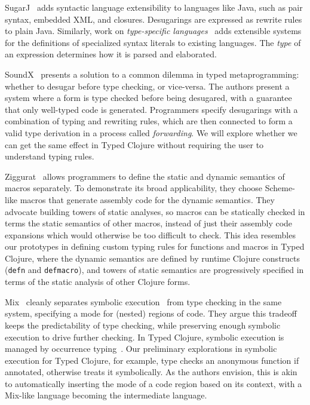 \documentclass[11pt]{iuthesis}
\begin{document}
SugarJ~\cite{Erdweg2011SJ}
adds syntactic language extensibility to languages like Java, such as pair
syntax, embedded XML, and closures.
Desugarings are expressed as rewrite rules to plain Java.
Similarly, work on \emph{type-specific languages}~\cite{omar2014safely}
adds extensible systems for the definitions of specialized syntax literals
to existing languages.
The \emph{type} of an expression determines how it is parsed and elaborated.

SoundX~\cite{Lorenzen2016STS} presents a solution to a common
dilemma in typed metaprogramming: whether to desugar before
type checking, or vice-versa.
The authors present a system where a form is type checked before 
being desugared, with a guarantee that only well-typed code is generated.
Programmers specify desugarings with a combination of typing and rewriting rules, 
which are then connected to form a valid type derivation
in a process called \emph{forwarding}.
We will explore whether we can get the same effect in Typed Clojure
without requiring the user to understand typing rules.

Ziggurat~\cite{Fisher06staticanalysis} allows programmers to define
the static and dynamic semantics of macros separately. To demonstrate its
broad applicability, they choose Scheme-like macros that generate assembly code
for the dynamic semantics.
They advocate building towers of static analyses, so
macros can be statically checked in terms the static semantics of other macros, instead
of just their assembly code expansions which would otherwise be too difficult to check.
This idea resembles our prototypes in defining custom typing rules for functions and macros in Typed Clojure,
where the dynamic semantics are defined by runtime Clojure constructs (\texttt{defn}
and \texttt{defmacro}), and towers of static semantics are progressively specified in terms of the static
analysis of other Clojure forms.

Mix~\cite{Khoo2010MTC} cleanly separates symbolic execution~\cite{King1976SEP} from type checking
in the same system, specifying a mode for (nested) regions of code.
They argue this tradeoff keeps the predictability of type checking, while preserving enough
symbolic execution to drive further checking.
In Typed Clojure, symbolic execution is managed by occurrence typing~\cite{TF10}.
Our preliminary explorations in symbolic execution for Typed Clojure, for example, type checks an
anonymous function if annotated, otherwise treats it symbolically.
As the authors envision, this is akin to automatically inserting
the mode of a code region based on its context, with a Mix-like language
becoming the intermediate language.
\end{document}
